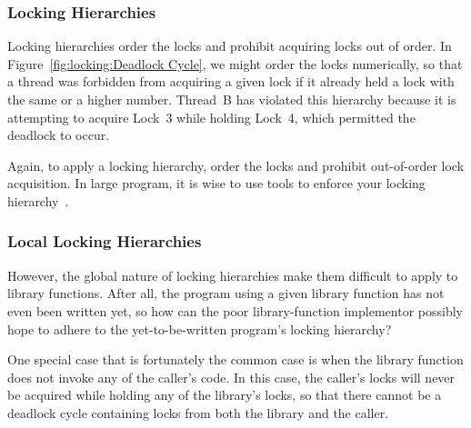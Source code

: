 \subsubsection{Locking Hierarchies}
\label{sec:locking:Locking Hierarchies}

Locking hierarchies order the locks and prohibit acquiring locks out
of order.
In Figure~\ref{fig:locking:Deadlock Cycle},
we might order the locks numerically, so that a thread was
forbidden from acquiring a given lock if it already held a lock
with the same or a higher number.
Thread~B has violated this hierarchy because it is attempting to
acquire Lock~3 while holding Lock~4, which permitted the deadlock
to occur.

Again, to apply a locking hierarchy, order the locks and prohibit
out-of-order lock acquisition.
In large program, it is wise to use tools to enforce your locking
hierarchy~\cite{JonathanCorbet2006lockdep}.

\subsubsection{Local Locking Hierarchies}
\label{sec:locking:Local Locking Hierarchies}

However, the global nature of locking hierarchies make them difficult to
apply to library functions.
After all, the program using a given library function has not even been
written yet, so how can the poor library-function implementor possibly
hope to adhere to the yet-to-be-written program's locking hierarchy?

One special case that is fortunately the common case is when
the library function does not invoke any of the caller's code.
In this case, the caller's locks will never be acquired while holding
any of the library's locks, so that there cannot be a deadlock cycle
containing locks from both the library and the caller.

